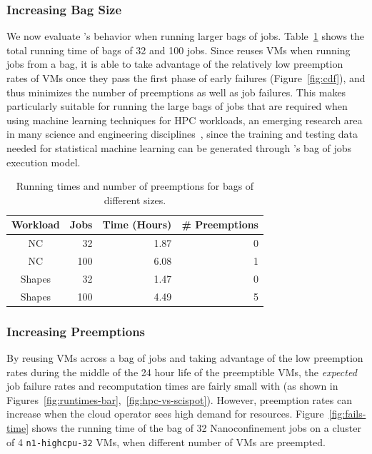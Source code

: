 \subsubsection{Increasing Bag Size}

We now evaluate \sysname's behavior when running larger bags of jobs.
Table~\ref{tab:100-jobs} shows the total running time of bags of 32 and 100 jobs.
Since \sysname reuses VMs when running jobs from a bag, it is able to take advantage of the relatively low preemption rates of VMs once they pass the first phase of early failures (Figure~\ref{fig:cdf}), and thus minimizes the number of preemptions as well as job failures. 
This makes \sysname particularly suitable for running the large bags of jobs that are required when using machine learning techniques for HPC workloads, an emerging research area in many science and engineering disciplines~\cite{ml.atomic2017,melko2017,sam2017,fu2017,long2015machine,ferguson2017machine,ward2018matminer,jcs1,jcs2,fox2019learning}, since the training and testing data needed for statistical machine learning can be generated through \sysname's bag of jobs execution model. 


\begin{table}
  \begin{tabular}{|c|r|r|r|}
    \hline
    Workload & Jobs & Time (Hours) & \# Preemptions \\
    \hline
    NC & 32  & 1.87 & 0 \\
    NC & 100  & 6.08 & 1 \\
    \hline
    Shapes & 32 & 1.47 & 0 \\
    Shapes & 100 & 4.49 & 5  \\  
    \hline
  \end{tabular}
  \caption{Running times and number of preemptions for bags of different sizes. }
  \label{tab:100-jobs}
  \vspace*{\myfigspace}
\end{table}




\subsubsection{Increasing Preemptions}

By reusing VMs across a bag of jobs and taking advantage of the low preemption rates during the middle of the 24 hour life of the preemptible VMs, the \emph{expected} job failure rates and recomputation times are fairly small with \sysname (as shown in Figures~\ref{fig:runtimes-bar},~\ref{fig:hpc-vs-scispot}).
However, preemption rates can increase when the cloud operator sees high demand for resources.
Figure~\ref{fig:fails-time} shows the running time of the bag of 32 Nanoconfinement jobs on a cluster of 4 \texttt{n1-highcpu-32} VMs, when different number of VMs are preempted. 

